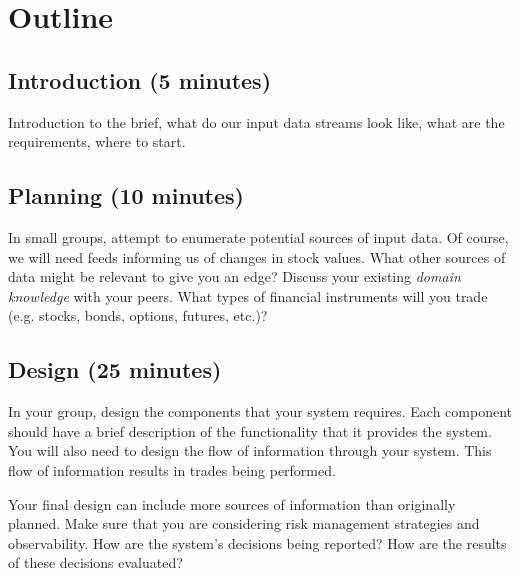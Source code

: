 \documentclass{csse4400}
\begin{document}
\section{Outline}

\subsection*{Introduction (5 minutes)}
Introduction to the brief,
what do our input data streams look like,
what are the requirements,
where to start.

\subsection*{Planning (10 minutes)}
In small groups, attempt to enumerate potential sources of input data.
Of course, we will need feeds informing us of changes in stock values.
What other sources of data might be relevant to give you an edge?
Discuss your existing \textsl{domain knowledge} with your peers.
What types of financial instruments will you trade (e.g. stocks, bonds, options, futures, etc.)?


\subsection*{Design (25 minutes)}

In your group, design the components that your system requires.
Each component should have a brief description of the functionality that it provides the system.
You will also need to design the flow of information through your system.
This flow of information results in trades being performed.

Your final design can include more sources of information than originally planned.
Make sure that you are considering risk management strategies and observability.
How are the system's decisions being reported?
How are the results of these decisions evaluated?
\end{document}
